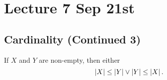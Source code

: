 \documentclass[notoc,notitlepage]{tufte-book}
\begin{document}


\chapter{Lecture 7 Sep 21st}%
\label{chp:lecture_7_sep_21st}

\section{Cardinality (Continued 3)}%
\label{sec:cardinality_continued_3}

\begin{thm}
\label{thm:comparability_of_cardinals}
  If $X$ and $Y$ are non-empty, then either
  \begin{equation*}
    \left|X\right| \leq \left|Y\right| \lor \left|Y\right| \leq \left|X\right|.
  \end{equation*}
\end{thm}
\end{document}
